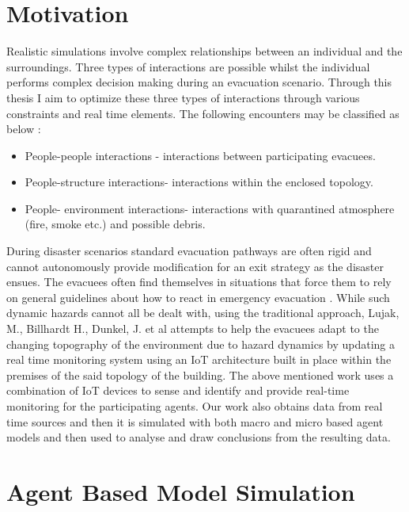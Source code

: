 \section{Motivation}
\label{sec:intro:Motivation}

Realistic simulations involve complex relationships between an individual and the surroundings. Three types of interactions are possible whilst the individual performs complex decision making during an evacuation scenario. Through this thesis I aim to optimize these three types of interactions through various constraints and real time elements. The following encounters may be classified as below \cite{ref1}:

\begin{itemize}
  \item People-people interactions -  interactions between participating evacuees.
  \item People-structure interactions- interactions within the enclosed topology.
  \item People- environment interactions- interactions with quarantined atmosphere (fire, smoke etc.) and possible debris. 
\end{itemize}

During disaster scenarios standard evacuation pathways are often rigid and cannot autonomously provide modification for an exit strategy as the disaster ensues. The evacuees often find themselves in situations that force them to rely on general guidelines about how to react in emergency evacuation \cite{ref3}.  While such dynamic hazards cannot all be dealt with, using the traditional approach, Lujak, M., Billhardt H., Dunkel, J. et al \cite{ref4} attempts to help the evacuees adapt to the changing topography of the environment due to hazard dynamics by updating a real time monitoring system using an IoT architecture built in place within the premises of the said topology of the building. The above mentioned work uses a combination of IoT devices to sense and identify and provide real-time monitoring for the participating agents. Our work also obtains data from real time sources and then it is simulated with both macro and micro based agent models and then used to analyse and draw conclusions from the resulting data.

\section{Agent Based Model Simulation}
\label{sec:intro:Agent Based Model Simulation}

